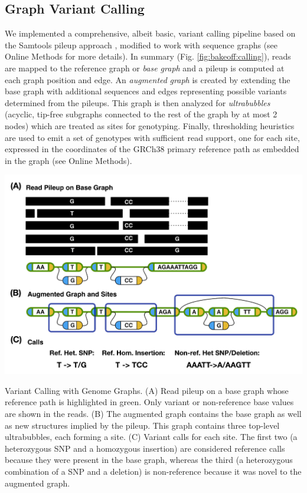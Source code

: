 \subsection{Graph Variant Calling}

We implemented a comprehensive, albeit basic, variant calling pipeline
based on the Samtools pileup approach \cite{Li2009-je}, modified to work
with sequence graphs (see Online Methods for more details). In summary
(Fig. \ref{fig:bakeoff:calling}), reads are mapped to the reference graph or \emph{base graph}
and a pileup is computed at each graph position and edge. An
\emph{augmented} \emph{graph} is created by extending the base graph
with additional sequences and edges representing possible variants
determined from the pileups. This graph is then analyzed for
\emph{ultrabubbles} (acyclic, tip-free subgraphs connected to the rest
of the graph by at most 2 nodes) which are treated as sites for
genotyping\cite{paten2017superbubbles}. Finally, thresholding heuristics
are used to emit a set of genotypes with sufficient read support, one
for each site, expressed in the coordinates of the GRCh38 primary
reference path as embedded in the graph (see Online Methods).

\begin{FPfigure}
\centering
\includegraphics[width=\textwidth]{figures/04_bakeoff/figure03.png}
\caption[Variant calling with genome graphs]{Variant Calling with Genome Graphs. (A) Read pileup on a base
graph whose reference path is highlighted in green. Only variant or
non-reference base values are shown in the reads. (B) The augmented
graph contains the base graph as well as new structures implied by the
pileup. This graph contains three top-level ultrabubbles, each forming a
site. (C) Variant calls for each site. The first two (a heterozygous SNP
and a homozygous insertion) are considered reference calls because they
were present in the base graph, whereas the third (a heterozygous
combination of a SNP and a deletion) is non-reference because it was
novel to the augmented graph.}
\label{fig:bakeoff:calling}
\end{FPfigure}

